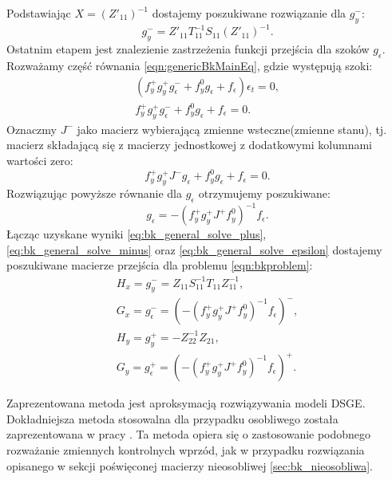 Podstawiając $X = (Z'_{11})^{-1}$ dostajemy poszukiwane rozwiązanie dla $g_y^-$:
\begin{equation}
    \label{eq:bk_general_solve_minus}
    g_y^- = Z'_{11}T_{11}^{-1}S_{11}(Z'_{11})^{-1}.
\end{equation}
Ostatnim etapem jest znalezienie zastrzeżenia funkcji przejścia dla szoków $g_\epsilon$. Rozważamy część równania \eqref{eqn:genericBkMainEq}, gdzie występują szoki:
\begin{equation}
\begin{gathered}
    (f_y^+ g_y^+ g_\epsilon^- + f_y^0 g_\epsilon + f_\epsilon) \epsilon_t = 0, \\
    f_y^+ g_y^+ g_\epsilon^- + f_y^0 g_\epsilon + f_\epsilon = 0.
\end{gathered}
\end{equation}
Oznaczmy $J^-$ jako macierz wybierającą zmienne wsteczne(zmienne stanu), tj. macierz składającą się z macierzy jednostkowej z dodatkowymi kolumnami wartości zero:
\begin{equation}
    f_y^+ g_y^+ J^- g_\epsilon + f_y^0 g_\epsilon + f_\epsilon = 0.
\end{equation}
Rozwiązując powyższe równanie dla $g_\epsilon$ otrzymujemy poszukiwane:
\begin{equation}
    \label{eq:bk_general_solve_epsilon}
    g_\epsilon = - (f_y^+ g_y^+ J^ + f_y^0)^{-1} f_\epsilon.
\end{equation}
Łącząc uzyskane wyniki \eqref{eq:bk_general_solve_plus}, \eqref{eq:bk_general_solve_minus} oraz \eqref{eq:bk_general_solve_epsilon} dostajemy poszukiwane macierze przejścia dla problemu \eqref{eqn:bkproblem}:
\begin{equation}
    \label{eq:bk_general_solution_final}
    \begin{gathered}
        H_x = g_y^- = Z_{11} S_{11}^{-1} T_{11} Z_{11}^{-1},\\
        G_x = g_\epsilon^- = (- (f_y^+ g_y^+ J^ + f_y^0)^{-1} f_\epsilon)^-,\\
        H_y = g_y^+ = -Z_{22}^{-1} Z_{21},\\
        G_y = g_\epsilon^+ = (- (f_y^+ g_y^+ J^ + f_y^0)^{-1} f_\epsilon)^+.
    \end{gathered}
\end{equation}

Zaprezentowana metoda jest aproksymacją rozwiązywania modeli DSGE. Dokładniejsza metoda stosowalna dla przypadku osobliwego została zaprezentowana w pracy \cite{KLEIN20001405}. Ta metoda opiera się o zastosowanie podobnego rozważanie zmiennych kontrolnych wprzód, jak w przypadku rozwiązania opisanego w sekcji poświęconej macierzy nieosobliwej \ref{sec:bk_nieosobliwa}.

